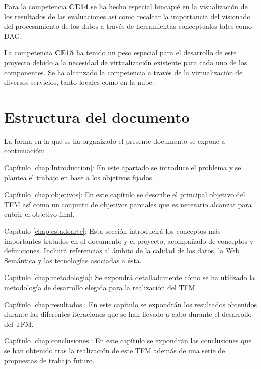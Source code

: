 Para la competencia \textbf{CE14} se ha hecho especial hincapié en la
visualización de los resultados de las evaluaciones así como recalcar la
importancia del visionado del procesamiento de los datos a través de
herramientas conceptuales tales como \acf{DAG}. 

La competencia \textbf{CE15} ha tenido un peso especial para el desarrollo de
este proyecto debido a la necesidad de virtualización existente para cada uno de
los componentes. Se ha alcanzado la competencia a través de la virtualización de
diversos servicios, tanto locales como en la nube. 

\section{Estructura del documento}

La forma en la que se ha organizado el presente documento se expone a
continuación: 

\begin{definitionlist}
\item[Capítulo \ref{chap:Introduccion}: \nameref{chap:Introduccion}] En este
  apartado se introduce el problema y se plantea el trabajo en base a los
  objetivos fijados. 


\item[Capítulo \ref{chap:objetivos}: \nameref{chap:objetivos}] En este capítulo
  se describe el principal objetivo del \acs{TFM} así como un conjunto de
  objetivos parciales que es necesario alcanzar para cubrir el objetivo
  final. 

\item[Capítulo \ref{chap:estadoarte}: \nameref{chap:estadoarte}] Esta sección
  introducirá los conceptos más importantes tratados en el documento y el
  proyecto, acompañado de conceptos y definiciones. Incluirá referencias al
  ámbito de la calidad de los datos, la Web Semántica y las tecnologías
  asociadas a ésta. 

\item[Capítulo \ref{chap:metodologia}: \nameref{chap:metodologia}] Se expondrá
  detalladamente cómo se ha utilizado la metodología de desarrollo elegida para la realización del \acs{TFM}.

\item[Capítulo \ref{chap:resultados}: \nameref{chap:resultados}] En este
  capítulo se expondrán los resultados obtenidos durante las diferentes
  iteraciones que se han llevado a cabo durante el desarrollo del
  \acs{TFM}. 

\item[Capítulo \ref{chap:conclusiones}: \nameref{chap:conclusiones}] En este
  capítulo se expondrán las conclusiones que se han obtenido tras la realización
  de este \acs{TFM} además de una serie de propuestas de trabajo futuro. 


\end{definitionlist}




